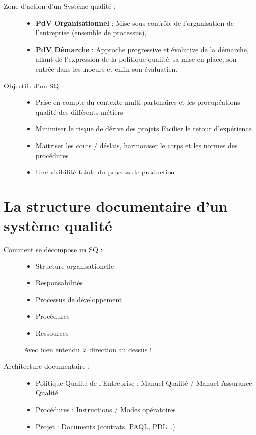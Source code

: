 \begin{description}
	\item[Zone d’action d’un Système qualité :]
	\begin{itemize}
		\item \textbf{PdV Organisationnel} : Mise sous contrôle de l’organisation de l’entreprise (ensemble de processus),
		\item \textbf{PdV Démarche} : Approche progressive et évolutive de la démarche, allant de l’expression de la politique qualité, sa mise en place, son entrée dans les moeurs et enfin son évaluation.
	\end{itemize}

	\item[Objectifs d’un SQ :]
	\begin{itemize}
		\item Prise en compte du contexte multi-partenaires et les procupéations qualité des différents métiers
		\item Minimiser le risque de dérive des projets
Facilier le retour d’expérience
		\item Maitriser les couts / déslais, harmoniser le corps et les normes des procédures
		\item Une visibilité totale du process de production
	\end{itemize}
\end{description}

\section{La structure documentaire d’un système qualité}


\begin{description}
\item[Comment se décompose un SQ :]
\begin{itemize}
\item Structure organisationelle
\item Responsabilités
\item Processus de développement
\item Procédures 
\item Ressources
\end{itemize}
Avec bien entendu la direction au dessus ! \\

\item[Architecture documentaire :]
\begin{itemize}
\item Politique Qualité de l’Entreprise : Manuel Qualité / Manuel Assurance Qualité
\item Procédures : Instructions / Modes opératoires 
\item Projet : Documents (contrats, PAQL, PDL...)
\end{itemize}
\end{description}

